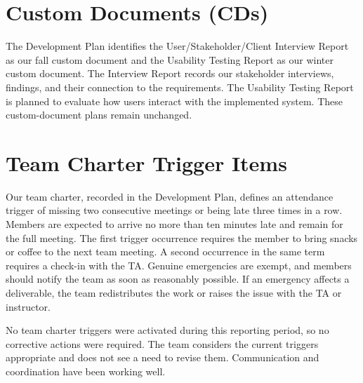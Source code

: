 \documentclass{article}
\begin{document}

\section{Custom Documents (CDs)}

The Development Plan identifies the User/Stakeholder/Client Interview Report as our fall custom document and the Usability Testing Report as our winter custom document. The Interview Report records our stakeholder interviews, findings, and their connection to the requirements. The Usability Testing Report is planned to evaluate how users interact with the implemented system. These custom-document plans remain unchanged.


\section{Team Charter Trigger Items}

Our team charter, recorded in the Development Plan, defines an attendance trigger of missing two consecutive meetings or being late three times in a row. Members are expected to arrive no more than ten minutes late and remain for the full meeting. The first trigger occurrence requires the member to bring snacks or coffee to the next team meeting. A second occurrence in the same term requires a check-in with the TA. Genuine emergencies are exempt, and members should notify the team as soon as reasonably possible. If an emergency affects a deliverable, the team redistributes the work or raises the issue with the TA or instructor.


No team charter triggers were activated during this reporting period, so no corrective actions were required. The team considers the current triggers appropriate and does not see a need to revise them. Communication and coordination have been working well.


\end{document}
